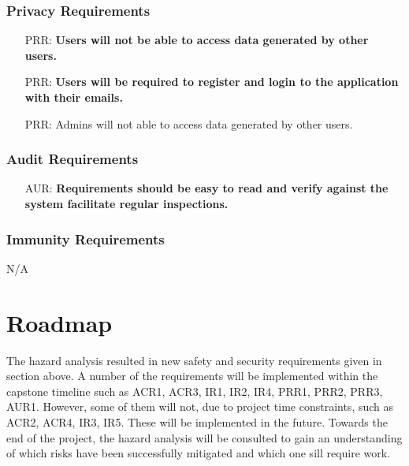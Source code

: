\documentclass{article}
\newcounter{prrreqnum} %
\newcounter{aurreqnum} %
\begin{document}
\subsubsection{Privacy Requirements}
\begin{itemize}
    \item[PRR\refstepcounter{prrreqnum}\theprrreqnum \label{R_Inputs}:] \textbf{Users will not be able to access data generated by other users.}
    \item[PRR\refstepcounter{prrreqnum}\theprrreqnum \label{R_Inputs}:] \textbf{Users will be required to register and login to the application with their emails.}
    \item[PRR\refstepcounter{prrreqnum}\theprrreqnum \label{R_Inputs}:] Admins will not able to access data generated by other users.
\end{itemize}

\subsubsection{Audit Requirements}
\begin{itemize}
    \item[AUR\refstepcounter{aurreqnum}\theaurreqnum \label{R_Inputs}:] \textbf{Requirements should be easy to read and verify against the system facilitate regular inspections.}
\end{itemize}

\subsubsection{Immunity Requirements}
N/A

\section{Roadmap}

The hazard analysis resulted in new safety and security requirements given in section above. A number of the requirements will be implemented within the capstone timeline such as ACR1, ACR3, IR1, IR2, IR4, PRR1, PRR2, PRR3, AUR1. However, some of them will not, due to project time constraints, such as ACR2, ACR4, IR3, IR5. These will be implemented in the future. Towards the end of the project, the hazard analysis will be consulted to gain an understanding of which risks have been successfully mitigated and which one sill require work.
\end{document}

